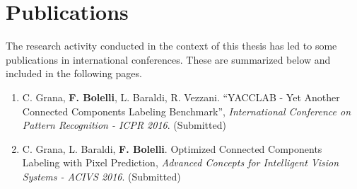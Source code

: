 
\chapter{Publications} %

\label{chp:AppendixB} %


The research activity conducted in the context of this thesis has led to some publications in international conferences. These are summarized below and included in the following pages.

\begin{enumerate}
\item C. Grana, \textbf{F. Bolelli}, L. Baraldi, R. Vezzani. ``YACCLAB - Yet Another Connected Components Labeling Benchmark'', \textit{International Conference on Pattern Recognition - ICPR 2016}. (Submitted)
\item C. Grana, L. Baraldi, \textbf{F. Bolelli}. Optimized Connected Components Labeling with Pixel Prediction, \textit{Advanced Concepts for Intelligent Vision Systems - ACIVS 2016}. (Submitted)

\end{enumerate}

\clearpage
\pagestyle{empty}


\clearpage
\pagestyle{empty}
